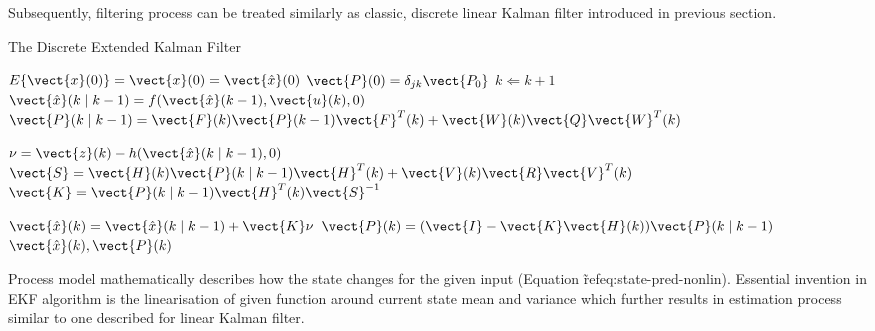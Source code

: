 Subsequently, filtering process can be treated similarly as classic, discrete linear Kalman filter introduced in previous section. 
\begin{algorithm}%
\caption{The Discrete Extended Kalman Filter} \label{alg:ekf}
\begin{algorithmic}
\REQUIRE $E\lbrace \vect{x}(0) \rbrace = \vect{x}(0) = \vect{\hat{x}}(0)$
\REQUIRE $\vect{P}(0) = \delta_{jk} \vect{P_{0}} $ 
\LOOP 
	\STATE $k \Leftarrow k+1$ 
	\STATE $\vect{\hat{x}}(k \mid k-1) = f(\vect{\hat{x}}(k-1), \vect{u}(k), 0)$
	\STATE $\vect{P}(k \mid k-1) = \vect{F}(k) \vect{P}(k-1) \vect{F}^{T}(k) + \vect{W}(k) \vect{Q} \vect{W}^{T}(k)$
	
	\STATE $\nu = \vect{z}(k) - h(\vect{\hat{x}}(k \mid k-1), 0)$	
	\STATE $\vect{S} = \vect{H}(k) \vect{P}(k \mid k-1) \vect{H}^{T}(k) + \vect{V}(k) \vect{R} \vect{V}^{T}(k)$	
	\STATE $\vect{K} = \vect{P}(k \mid k-1) \vect{H}^{T}(k) \vect{S}^{-1}$	
	
	\STATE $\vect{\hat{x}}(k) = \vect{\hat{x}}(k \mid k-1) + \vect{K} \nu$
	\STATE $\vect{P}(k) = (\vect{I}-\vect{K}\vect{H}(k))\vect{P}(k \mid k-1)$
	\RETURN $\vect{\hat{x}}(k), \vect{P}(k)$
\ENDLOOP
\end{algorithmic}
\end{algorithm}
Process model mathematically describes how the state changes for the given input (Equation \~ref{eq:state-pred-nonlin}). Essential invention in EKF algorithm is the linearisation of given function around current state mean and variance which further results in estimation process similar to one described for linear Kalman filter.
